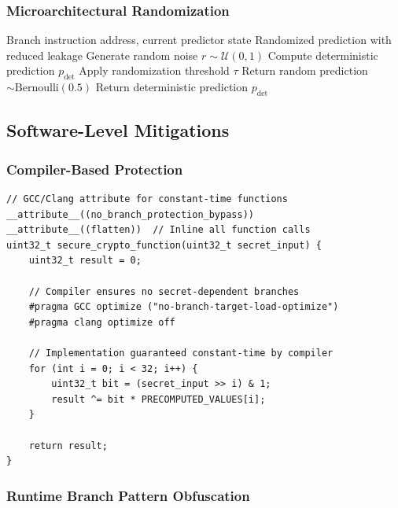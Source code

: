 \documentclass[11pt,a4paper]{article}
\theoremstyle{definition}
\begin{document}
\subsubsection{Microarchitectural Randomization}

\begin{algorithm}
\caption{Randomized Branch Prediction}
\begin{algorithmic}[1]
\REQUIRE Branch instruction address, current predictor state
\ENSURE Randomized prediction with reduced leakage
\STATE Generate random noise $r \sim \mathcal{U}(0, 1)$
\STATE Compute deterministic prediction $p_{\text{det}}$
\STATE Apply randomization threshold $\tau$
    \STATE Return random prediction $\sim \text{Bernoulli}(0.5)$
\ELSE
    \STATE Return deterministic prediction $p_{\text{det}}$
\ENDIF
\end{algorithmic}
\end{algorithm}

\subsection{Software-Level Mitigations}

\subsubsection{Compiler-Based Protection}

\begin{lstlisting}[caption={Compiler Directive for Branch Protection}]
// GCC/Clang attribute for constant-time functions
__attribute__((no_branch_protection_bypass))
__attribute__((flatten))  // Inline all function calls
uint32_t secure_crypto_function(uint32_t secret_input) {
    uint32_t result = 0;
    
    // Compiler ensures no secret-dependent branches
    #pragma GCC optimize ("no-branch-target-load-optimize")
    #pragma clang optimize off
    
    // Implementation guaranteed constant-time by compiler
    for (int i = 0; i < 32; i++) {
        uint32_t bit = (secret_input >> i) & 1;
        result ^= bit * PRECOMPUTED_VALUES[i];
    }
    
    return result;
}
\end{lstlisting}

\subsubsection{Runtime Branch Pattern Obfuscation}
\end{document}
